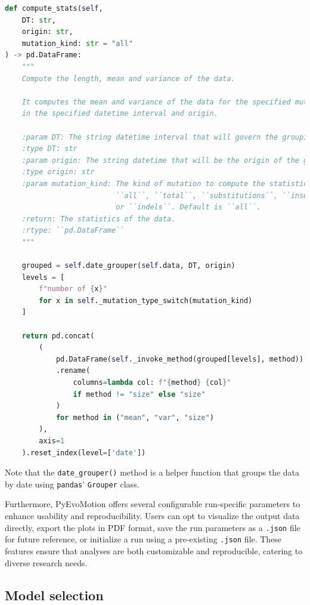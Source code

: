 \begin{lstlisting}[language=Python, caption={Calculation of mean and variance of mutation counts per time interval.}]
def compute_stats(self,
    DT: str,
    origin: str,
    mutation_kind: str = "all"
) -> pd.DataFrame:
    """
    Compute the length, mean and variance of the data.

    It computes the mean and variance of the data for the specified mutation kind (or kinds)
    in the specified datetime interval and origin.

    :param DT: The string datetime interval that will govern the grouping.
    :type DT: str
    :param origin: The string datetime that will be the origin of the grouping.
    :type origin: str
    :param mutation_kind: The kind of mutation to compute the statistics for. Has to be one of 
                          ``all``, ``total``, ``substitutions``, ``insertions``, ``deletions``
                          or ``indels``. Default is ``all``.
    :return: The statistics of the data.
    :rtype: ``pd.DataFrame``
    """

    grouped = self.date_grouper(self.data, DT, origin)
    levels = [
        f"number of {x}"
        for x in self._mutation_type_switch(mutation_kind)
    ]

    return pd.concat(
        (
            pd.DataFrame(self._invoke_method(grouped[levels], method))
            .rename(
                columns=lambda col: f"{method} {col}"
                if method != "size" else "size"
            )
            for method in ("mean", "var", "size")
        ),
        axis=1
    ).reset_index(level=['date'])
\end{lstlisting}

Note that the \texttt{date\_grouper()} method is a helper function that groups the data by date using \texttt{pandas}' \texttt{Grouper} class.

Furthermore, PyEvoMotion offers several configurable run-specific parameters to enhance usability and reproducibility. Users can opt to visualize the output data directly, export the plots in PDF format, save the run parameters as a \texttt{.json} file for future reference, or initialize a run using a pre-existing \texttt{.json} file. These features ensure that analyses are both customizable and reproducible, catering to diverse research needs.

\subsection{Model selection}


